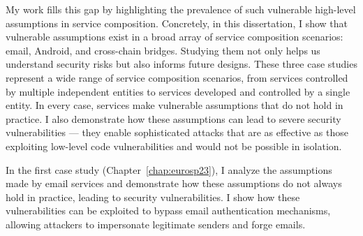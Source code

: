 \begin{dissertationintroduction}


My work fills this gap by highlighting the prevalence of such vulnerable high-level assumptions in service composition. Concretely, in this dissertation, I show that vulnerable assumptions exist in a broad array of service composition scenarios: email, Android, and cross-chain bridges. Studying them not only helps us understand security risks but also informs future designs. These three case studies represent a wide range of service composition scenarios, from services controlled by multiple independent entities to services developed and controlled by a single entity. In every case, services make vulnerable assumptions that do not hold in practice. I also demonstrate how these assumptions can lead to severe security vulnerabilities --- they enable sophisticated attacks that are as effective as those exploiting low-level code vulnerabilities and would not be possible in isolation. 





In the first case study (Chapter~\ref{chap:eurosp23}), I analyze the assumptions made by email services and demonstrate how these assumptions do not always hold in practice, leading to security vulnerabilities. I show how these vulnerabilities can be exploited to bypass email authentication mechanisms, allowing attackers to impersonate legitimate senders and forge emails.


\end{dissertationintroduction}
